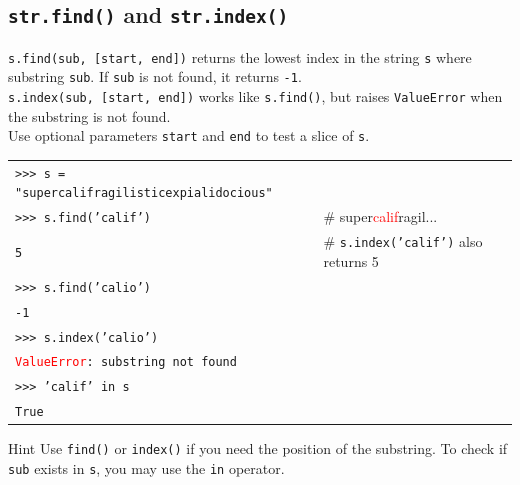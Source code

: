 \documentclass[t,handout,9pt]{beamer}
\begin{document}
\subsection{\texttt{str.find()} and \texttt{str.index()}}
\begin{frame}
\texttt{s.find(sub, [start, end])} returns the lowest index in the string \texttt{s} where substring \texttt{sub}. If \texttt{sub} is not found, it returns \texttt{-1}.\\
\texttt{s.index(sub, [start, end])} works like \texttt{s.find()}, but raises \texttt{ValueError} when the substring is not found.\\
Use optional parameters \texttt{start} and \texttt{end} to test a slice of \texttt{s}.
\vfill
\begin{table}[]
\begin{flushleft}
\begin{tabular}{ll}
\texttt{>{}>{}> s = "supercalifragilisticexpialidocious"} &  \\
\texttt{>{}>{}> s.find('calif')} &  \# super\textcolor{red}{calif}ragil... \\
\texttt{5} &  \# \texttt{s.index('calif')} also returns 5\\
\texttt{>{}>{}> s.find('calio')} &  \\
\texttt{-1} &  \\
\texttt{>{}>{}> s.index('calio')} &  \\
\texttt{\textcolor{red}{ValueError}: substring not found} &  \\
\texttt{>{}>{}> 'calif' in s} &  \\
\texttt{True} &  \\
\end{tabular}
\end{flushleft}
\end{table}
\vfill
\begin{block}{Hint}
Use \texttt{find()} or \texttt{index()} if you need the position of the substring. To check if \texttt{sub} exists in \texttt{s}, you may use the \texttt{in} operator.
\end{block}
\vfill
\end{frame}
%
\end{document}
